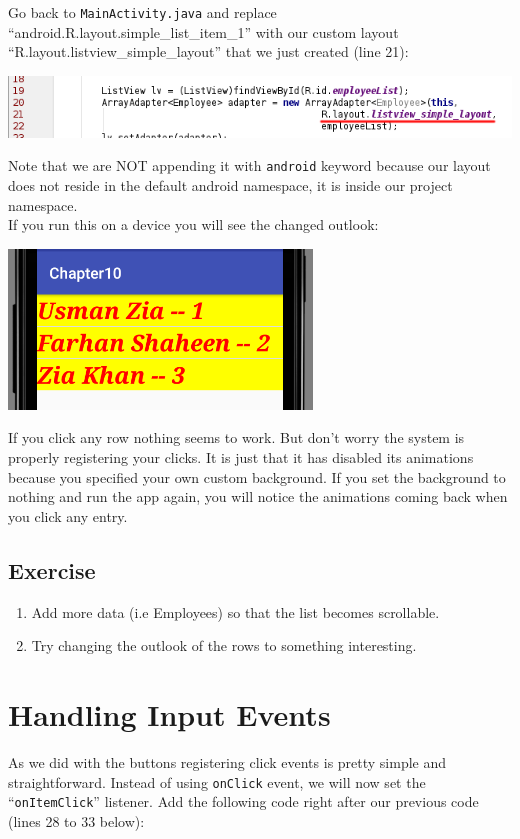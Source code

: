 Go back to \texttt{MainActivity.java} and replace ``android.R.layout.simple\_list\_item\_1'' with our custom layout ``R.layout.listview\_simple\_layout'' that we just created (line 21):

\begin{center}
	\includegraphics[scale=0.4]{chapters/ch10/images/26}
\end{center}

Note that we are NOT appending it with \texttt{android} keyword because our layout does not reside in the default android namespace, it is inside our project namespace. \\

If you run this on a device you will see the changed outlook:

\begin{center}
	\includegraphics[scale=0.4]{chapters/ch10/images/27}
\end{center}

If you click any row nothing seems to work. But don't worry the system is properly registering your clicks. It is just that it has disabled its animations because you specified your own custom background. If you set the background to nothing and run the app again, you will notice the animations coming back when you click any entry.

\subsection{Exercise}
\begin{enumerate}
	\item Add more data (i.e Employees) so that the list becomes scrollable.
	\item Try changing the outlook of the rows to something interesting.
\end{enumerate}

\section{Handling Input Events}
As we did with the buttons registering click events is pretty simple and straightforward. Instead of using \texttt{onClick} event, we will now set the ``\texttt{onItemClick}'' listener. Add the following code right after our previous code (lines 28 to 33 below):

